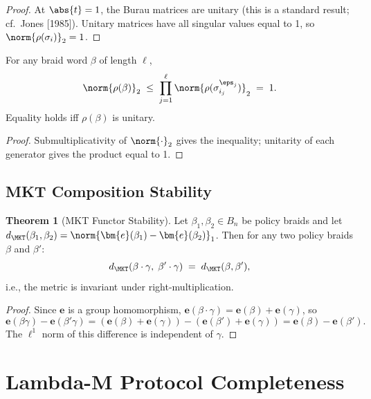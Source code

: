 \documentclass[12pt,letterpaper]{article}
\theoremstyle{definition}
\newtheorem{theorem}{Theorem}[section]
\theoremstyle{remark}
\begin{document}
\begin{proof}
  At \(\abs{t} = 1\), the Burau matrices are unitary (this is a standard
  result; cf.\ Jones [1985]).  Unitary matrices have all singular values equal
  to 1, so \(\norm{\rho(\sigma_i)}_2 = 1\).
\end{proof}

\begin{corollary}
  \label{cor:braid-word-norm}
  For any braid word \(\beta\) of length \(\ell\),
  \[
    \norm{\rho(\beta)}_2 \;\le\; \prod_{j=1}^{\ell}
    \norm{\rho(\sigma_{i_j}^{\eps_j})}_2 \;=\; 1.
  \]
  Equality holds iff \(\rho(\beta)\) is unitary.
\end{corollary}

\begin{proof}
  Submultiplicativity of \(\norm{\cdot}_2\) gives the inequality;
  unitarity of each generator gives the product equal to 1.
\end{proof}

\subsection{MKT Composition Stability}
\label{ssec:mkt-stability}

\begin{theorem}[MKT Functor Stability]
  \label{thm:mkt-stability}
  Let \(\beta_1, \beta_2 \in B_n\) be policy braids and let
  \(d_{\MKT}(\beta_1, \beta_2) = \norm{\bm{e}(\beta_1) - \bm{e}(\beta_2)}_1\).
  Then for any two policy braids \(\beta\) and \(\beta'\):
  \[
    d_{\MKT}(\beta \cdot \gamma,\; \beta' \cdot \gamma)
    \;=\; d_{\MKT}(\beta, \beta'),
  \]
  i.e., the metric is invariant under right-multiplication.
\end{theorem}

\begin{proof}
  Since \(\bm{e}\) is a group homomorphism,
  \(\bm{e}(\beta \cdot \gamma) = \bm{e}(\beta) + \bm{e}(\gamma)\), so
  \[
    \bm{e}(\beta\gamma) - \bm{e}(\beta'\gamma)
    = (\bm{e}(\beta) + \bm{e}(\gamma)) - (\bm{e}(\beta') + \bm{e}(\gamma))
    = \bm{e}(\beta) - \bm{e}(\beta').
  \]
  The \(\ell^1\) norm of this difference is independent of \(\gamma\).
\end{proof}

\section{Lambda-M Protocol Completeness}
\label{sec:lambda}
\end{document}
